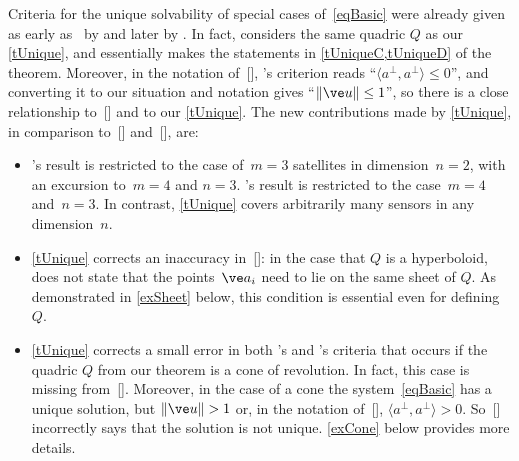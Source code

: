 \documentclass[reqno]{amsart}
\begin{document}
\begin{rem} \label{rSCA}%
  Criteria for the unique solvability of special cases
  of~\eqref{eqBasic} were already given as early
  as~\citeyear{Schmidt:1972} by  and later by
  . In fact, 
  considers the same quadric $Q$ as our \cref{tUnique}, and
  essentially makes the statements in \cref{tUniqueC,tUniqueD} of the
  theorem. Moreover, in the notation
  of~[], 's
  criterion reads ``$\langle a^\perp,a^\perp\rangle \le 0$'', and
  converting it to our situation and notation gives
  ``$\lVert\ve u\rVert \le 1$'', so there is a close relationship
  to~[] and to our \cref{tUnique}. The new
  contributions made by \cref{tUnique}, in comparison
  to~[] and~[],
  are:
  \begin{itemize}
  \item {}'s result is restricted to the case
    of~$m = 3$ satellites in 
    dimension~$n = 2$, with an excursion to~$m = 4$ and $n =
    3$. 's result is restricted to the
    case~$m = 4$ and~$n = 3$. In contrast, \cref{tUnique} covers
    arbitrarily many sensors in any dimension~$n$.
  \item \cref{tUnique} corrects an inaccuracy
    in~[]: in the case that $Q$ is a
    hyperboloid,  does not state that the
    points~$\ve a_i$ need to lie on the same sheet of $Q$. As
    demonstrated in \cref{exSheet} below, this condition is essential even
    for defining $Q$.
  \item \cref{tUnique} corrects a small error in both
    's and 's
    criteria that occurs if the quadric $Q$ from our theorem is a cone
    of revolution. In fact, this case is missing
    from~[]. Moreover, in the case of a cone
    the system~\eqref{eqBasic} has a unique solution, but
    $\lVert\ve u\rVert > 1$ or, in the notation
    of~[],
    $\langle a^\perp,a^\perp\rangle >
    0$. So~[] incorrectly says that the
    solution is not unique. \cref{exCone} below provides more details.

\end{itemize}
\end{rem}
\end{document}
